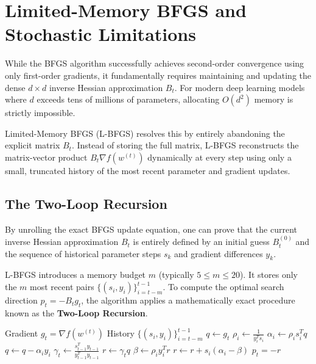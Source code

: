 \section{Limited-Memory BFGS and Stochastic Limitations}
\label{sec:lbfgs}

While the BFGS algorithm successfully achieves second-order convergence using only first-order gradients, it fundamentally requires maintaining and updating the dense $d \times d$ inverse Hessian approximation $B_t$. For modern deep learning models where $d$ exceeds tens of millions of parameters, allocating $O(d^2)$ memory is strictly impossible.

Limited-Memory BFGS (L-BFGS) \cite{liu1989limited} resolves this by entirely abandoning the explicit matrix $B_t$. Instead of storing the full matrix, L-BFGS reconstructs the matrix-vector product $B_t \nabla f(w^{(t)})$ dynamically at every step using only a small, truncated history of the most recent parameter and gradient updates.

\subsection{The Two-Loop Recursion}
By unrolling the exact BFGS update equation, one can prove that the current inverse Hessian approximation $B_t$ is entirely defined by an initial guess $B_t^{(0)}$ and the sequence of historical parameter steps $s_k$ and gradient differences $y_k$. 

L-BFGS introduces a memory budget $m$ (typically $5 \le m \le 20$). It stores only the $m$ most recent pairs $\{(s_i, y_i)\}_{i=t-m}^{t-1}$. To compute the optimal search direction $p_t = -B_t g_t$, the algorithm applies a mathematically exact procedure known as the \textbf{Two-Loop Recursion}.

\begin{algorithm}[H]
\caption{L-BFGS Two-Loop Recursion}
\begin{algorithmic}[1]
\Require Gradient $g_t = \nabla f(w^{(t)})$
\Require History $\{(s_i, y_i)\}_{i=t-m}^{t-1}$
\State $q \gets g_t$
 
    \State $\rho_i \gets \frac{1}{y_i^T s_i}$
    \State $\alpha_i \gets \rho_i s_i^T q$
    \State $q \gets q - \alpha_i y_i$
\EndFor
\State $\gamma_t \gets \frac{s_{t-1}^T y_{t-1}}{y_{t-1}^T y_{t-1}}$ 
\State $r \gets \gamma_t q$
 
    \State $\beta \gets \rho_i y_i^T r$
    \State $r \gets r + s_i (\alpha_i - \beta)$
\EndFor
\State \Return $p_t = -r$
\end{algorithmic}
\end{algorithm}

